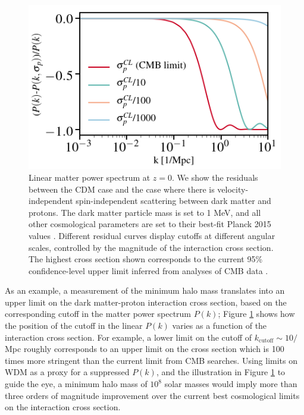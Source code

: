 \begin{figure}
\centering
\includegraphics[width=0.6\columnwidth]{figures/dmbaryon_pk2.png}
\caption{Linear matter power spectrum at $z=0$. We show the residuals between the CDM case and the case where there is velocity-independent spin-independent scattering between dark matter and protons. The dark matter particle mass is set to 1 MeV, and all other cosmological parameters are set to their best-fit Planck 2015 values \citep{Ade:2015xua}. Different residual curves display cutoffs at different angular scales, controlled by the magnitude of the interaction cross section. The highest cross section shown corresponds to the current 95\% confidence-level upper limit inferred from analyses of CMB data \citep{Gluscevic:2017ywp,Boddy:2018kfv}.
}
\label{fig:dmbaryon_pk}
\end{figure}
As an example, a measurement of the minimum halo mass translates into an upper limit on the dark matter-proton interaction cross section, based on the corresponding cutoff in the matter power spectrum $P(k)$; Figure \ref{fig:dmbaryon_pk} shows how the position of the cutoff in the linear $P(k)$ varies as a function of the interaction cross section. For example, a lower limit on the cutoff of $k_\text{cutoff}\sim 10/$Mpc roughly corresponds to an upper limit on the cross section which is 100 times more stringent than the current limit from CMB searches. Using limits on WDM as a proxy for a suppressed $P(k)$, and the illustration in Figure \ref{fig:dmbaryon_pk} to guide the eye, a minimum halo mass of $10^8$ solar masses would imply more than three orders of magnitude improvement over the current best cosmological limits on the interaction cross section.

